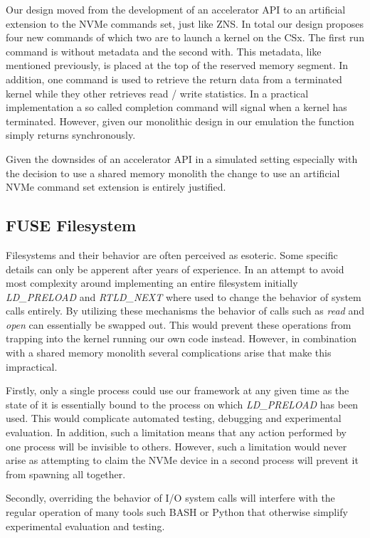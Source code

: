 Our design moved from the development of an accelerator API to an artificial
extension to the NVMe commands set, just like ZNS. In total our design proposes
four new commands of which two are to launch a kernel on the CSx. The first
run command is without metadata and the second with. This metadata, like
mentioned previously, is placed at the top of the reserved memory segment. In
addition, one command is used to retrieve the return data from a terminated
kernel while they other retrieves read / write statistics. In a practical
implementation a so called completion command will signal when a kernel has
terminated. However, given our monolithic design in our emulation the function
simply returns synchronously.

Given the downsides of an accelerator API in a simulated setting especially
with the decision to use a shared memory monolith the change to use an
artificial NVMe command set extension is entirely justified.

\subsection{FUSE Filesystem}

Filesystems and their behavior are often perceived as esoteric. Some specific
details can only be apperent after years of experience. In an attempt to avoid
most complexity around implementing an entire filesystem initially
\textit{LD\_PRELOAD} and \textit{RTLD\_NEXT} where used to change the behavior
of system calls entirely. By utilizing these mechanisms the behavior of calls
such as \textit{read} and \textit{open} can essentially be swapped out. This
would prevent these operations from trapping into the kernel running our own
code instead. However, in combination with a shared memory monolith several
complications arise that make this impractical.

Firstly, only a single process could use our framework at any given time as the
state of it is essentially bound to the process on which \textit{LD\_PRELOAD}
has been used. This would complicate automated testing, debugging and
experimental evaluation. In addition, such a limitation means that any action
performed by one process will be invisible to others. However, such a limitation
would never arise as attempting to claim the NVMe device in a second process
will prevent it from spawning all together.

Secondly, overriding the behavior of I/O system calls will interfere with the
regular operation of many tools such BASH or Python that otherwise simplify
experimental evaluation and testing.

